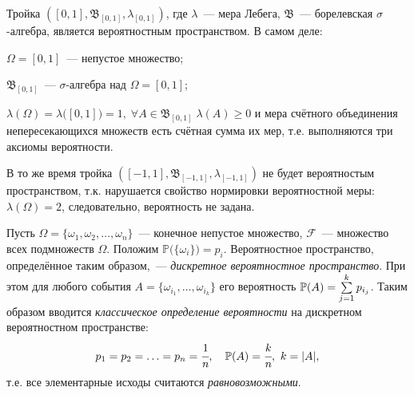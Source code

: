 \begin{exmp}
    Тройка $([0, 1], \mathfrak{B}_{[0, 1]}, \lambda_{[0, 1]})$, где $\lambda$~--- мера Лебега, $\mathfrak{B}$~--- борелевская $\sigma$-алгебра, является вероятностным пространством. 
    В самом деле:
    \begin{compactlist}
        \item $\Omega = [0, 1]$~--- непустое множество;
        \item $\mathfrak{B}_{[0, 1]}$~--- $\sigma$-алгебра над $\Omega = [0, 1]$;
        \item $\lambda(\Omega) = \lambda\bigl( {[0, 1]} \bigr) = 1, \; \forall A \in \mathfrak{B}_{[0, 1]} \; \lambda(A) \geqslant 0$ и мера счётного объединения непересекающихся множеств есть счётная сумма их мер, т.е. выполняются три аксиомы вероятности.
    \end{compactlist}
    В то же время тройка $([-1, 1], \mathfrak{B}_{[-1, 1]}, \lambda_{[-1, 1]})$ не будет вероятностым пространством, т.к. нарушается свойство нормировки вероятностной меры: $\lambda(\Omega) = 2$, следовательно, вероятность не задана.
\end{exmp}

\begin{defn}
    Пусть $\Omega = \{\omega_1, \omega_2, \ldots, \omega_n\}$~--- конечное непустое множество, $\mathcal{F}$~--- множество всех подмножеств $\Omega$. 
    Положим $\mathbb{P} \bigl(\{\omega_i\}\bigr) = p_i$. 
    Вероятностное пространство, определённое таким образом,~--- \textit{дискретное вероятностное пространство}. 
    При этом для любого события $A = \{\omega_{i_1}, \ldots, \omega_{i_k}\}$ его вероятность ${\mathbb{P}(A)} = \sum\limits_{j=1}^k p_{i_j}$. 
    Таким образом вводится \textit{классическое определение вероятности} на дискретном вероятностном пространстве:
    \begin{equation*}
        p_1 = p_2 = \ldots =p_n=\cfrac{1}{n}, \quad {\mathbb{P}(A)} = \cfrac{k}{n},~ k=|A|,
    \end{equation*}
    т.е. все элементарные исходы считаются \textit{равновозможными}.
\end{defn}